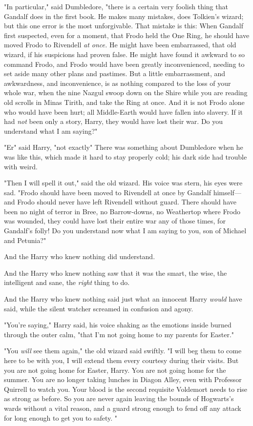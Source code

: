 "In particular," said Dumbledore, "there is a certain very foolish thing that
Gandalf does in the first book. He makes many mistakes, does Tolkien's wizard;
but this one error is the most unforgivable. That mistake is this: When Gandalf
first suspected, even for a moment, that Frodo held the One Ring, he should
have moved Frodo to Rivendell \emph{at once.} He might have been embarrassed,
that old wizard, if his suspicions had proven false. He might have found it
awkward to so command Frodo, and Frodo would have been greatly inconvenienced,
needing to set aside many other plans and pastimes. But a little embarrassment,
and awkwardness, and inconvenience, is as nothing compared to the loss of your
whole war, when the nine Nazgul swoop down on the Shire while you are reading
old scrolls in Minas Tirith, and take the Ring at once. And it is not Frodo
alone who would have been hurt; all Middle-Earth would have fallen into
slavery. If it had \emph{not} been only a story, Harry, they would have lost
their war. Do you understand what I am saying?"

"Er{\el}" said Harry, "not exactly{\el}" There was something about
Dumbledore when he was like this, which made it hard to stay properly cold; his
dark side had trouble with weird.

"Then I will spell it out," said the old wizard. His voice was stern, his eyes
were sad. "Frodo should have been moved to Rivendell at once by Gandalf
himself---and Frodo should never have left Rivendell without guard. There
should have been no night of terror in Bree, no Barrow-downs, no Weathertop
where Frodo was wounded, they could have lost their entire war any of those
times, for Gandalf's folly! Do you understand now what I am saying to you, son
of Michael and Petunia?"

And the Harry who knew nothing did understand.

And the Harry who knew nothing saw that it was the smart, the wise, the
intelligent and sane, the \emph{right} thing to do.

And the Harry who knew nothing said just what an innocent Harry \emph{would}
have said, while the silent watcher screamed in confusion and agony.

"You're saying," Harry said, his voice shaking as the emotions inside burned
through the outer calm, "that I'm not going home to my parents for Easter."

"You \emph{will} see them again," the old wizard said swiftly. "I will beg them
to come here to be with you, I will extend them every courtesy during their
visits. But you are not going home for Easter, Harry. You are not going home
for the summer. You are no longer taking lunches in Diagon Alley, even with
Professor Quirrell to watch you. Your blood is the second requisite Voldemort
needs to rise as strong as before. So you are never again leaving the bounds of
Hogwarts's wards without a vital reason, and a guard strong enough to fend off
any attack for long enough to get you to safety. "

